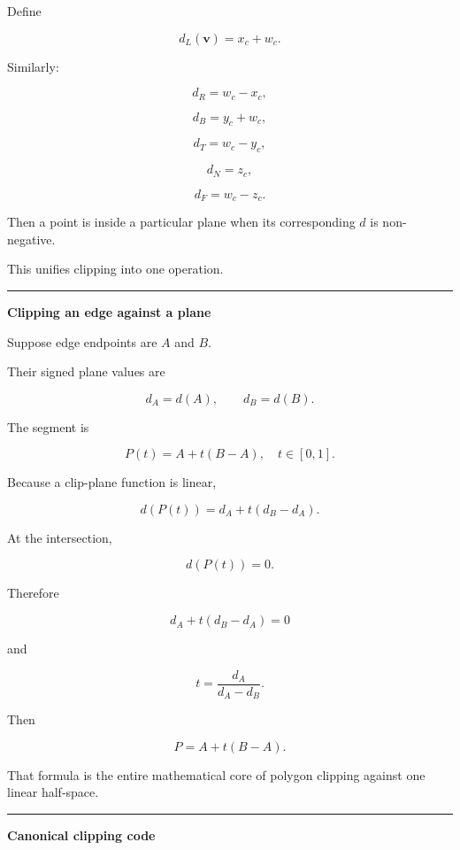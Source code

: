 Define

\[
d_L(\mathbf v)=x_c+w_c.
\]

Similarly:

\[
d_R=w_c-x_c,
\]

\[
d_B=y_c+w_c,
\]

\[
d_T=w_c-y_c,
\]

\[
d_N=z_c,
\]

\[
d_F=w_c-z_c.
\]

Then a point is inside a particular plane when its corresponding \(d\) is non-negative.

This unifies clipping into one operation.

\begin{center}\rule{0.5\linewidth}{0.5pt}\end{center}

\textbf{Clipping an edge against a plane}

Suppose edge endpoints are \(A\) and \(B\).

Their signed plane values are

\[
d_A=d(A),\qquad
d_B=d(B).
\]

The segment is

\[
P(t)=A+t(B-A),\quad t\in[0,1].
\]

Because a clip-plane function is linear,

\[
d(P(t))
=
d_A+t(d_B-d_A).
\]

At the intersection,

\[
d(P(t))=0.
\]

Therefore

\[
d_A+t(d_B-d_A)=0
\]

and

\[
\boxed{
t=
\frac{d_A}{d_A-d_B}
}.
\]

Then

\[
\boxed{
P=A+t(B-A)
}.
\]

That formula is the entire mathematical core of polygon clipping against one linear half-space.

\begin{center}\rule{0.5\linewidth}{0.5pt}\end{center}

\textbf{Canonical clipping code}


